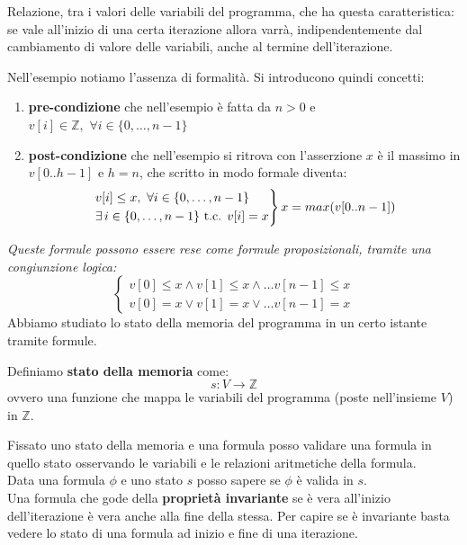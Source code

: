 \begin{definizione}
    Relazione, tra i valori delle variabili del programma, che ha questa caratteristica: se vale all'inizio di una certa iterazione allora varrà, indipendentemente dal cambiamento di valore delle variabili, anche al termine dell'iterazione.
\end{definizione}
Nell'esempio notiamo l'assenza di formalità. Si introducono quindi
concetti:
\begin{enumerate}
	\item \textbf{pre-condizione} che nell'esempio è fatta da $n>0$ e
	      $v[i]\in\mathbb{Z},\,\,\forall i\in \{0,\ldots, n-1\}$
	\item \textbf{post-condizione} che nell'esempio si ritrova con l'asserzione $x$
	      è il massimo in $v[0..h-1]$ e $h=n$, che scritto in modo formale diventa:
	      \[
	      	\begin{rcases}
	      		v[i]\leq x,\,\,\forall i\in \{0,\ldots, n-1\}\\
	      		\exists\, i\in\{0,\ldots, n-1\}\mbox{ t.c. } v[i]=x
	      	\end{rcases}
	      	x=max(v[0..n-1])
	      \]
\end{enumerate}
\textit{Queste formule possono essere rese come formule proposizionali, tramite
una congiunzione logica:}
\[
	\begin{cases}
		v[0]\leq x \land v[1]\leq x\land\ldots v[n-1]\leq x \\
		v[0]= x \lor v[1]= x\lor\ldots v[n-1]=x             
	\end{cases}
\]
Abbiamo studiato lo stato della memoria del programma in un certo istante
tramite formule.
\begin{definizione}
	Definiamo \textbf{stato della memoria} come:
	\[s:V\to\mathbb{Z}\]
	ovvero una funzione che mappa le variabili del programma (poste nell'insieme
	$V$) in $\mathbb{Z}$.
\end{definizione} \vspace{5mm} %
Fissato uno stato della memoria e una formula posso validare una formula in
quello stato osservando le variabili e le relazioni aritmetiche della
formula.\\
Data una formula $\phi$ e uno stato $s$ posso sapere se $\phi$ è valida in
$s$.\\
Una formula che gode della \textbf{proprietà invariante} se è vera all'inizio
dell'iterazione è vera anche alla fine della stessa. Per capire se è invariante
basta vedere lo stato di una formula ad inizio e fine di una iterazione.\\
